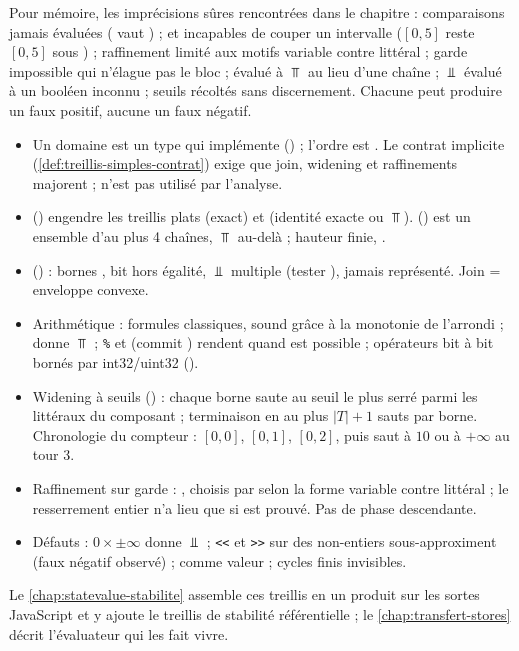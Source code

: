 Pour mémoire, les imprécisions sûres rencontrées dans le chapitre :
comparaisons jamais évaluées ( vaut ) ;
 et  incapables de couper un intervalle
($[0,5]$ reste $[0,5]$ sous ) ; raffinement limité aux motifs
\og variable contre littéral\fg{} ; garde impossible qui n'élague pas le
bloc ;  évalué à $\Top$ au lieu d'une chaîne ;
\code{!}$\Bot$ évalué à un booléen inconnu ; seuils récoltés sans
discernement. Chacune peut produire un faux positif, aucune un faux négatif.

\begin{resume}
\begin{itemize}
  \item Un domaine est un type qui implémente 
    () ; l'ordre est . Le contrat
    implicite (\cref{def:treillis-simples-contrat}) exige que join, widening
    et raffinements majorent ;  n'est pas utilisé par l'analyse.
  \item {} () engendre les
    treillis plats  (exact) et  (identité
    exacte ou $\Top$).  () est un ensemble
    d'au plus 4 chaînes, $\Top$ au-delà ; hauteur finie, .
  \item {} () : bornes , bit
     hors égalité, $\Bot$ multiple (tester ),
     jamais représenté. Join = enveloppe convexe.
  \item Arithmétique : formules classiques, sound grâce à la monotonie de
    l'arrondi ; \code{/} donne $\Top$ ; \texttt{\%} et \code{**} (commit
    ) rendent  quand  est possible ;
    opérateurs bit à bit bornés par int32/uint32 ().
  \item Widening à seuils () : chaque borne saute au seuil le plus
    serré parmi les littéraux du composant ; terminaison en au plus
    $|T| + 1$ sauts par borne. Chronologie du compteur : $[0,0]$, $[0,1]$,
    $[0,2]$, puis saut à $10$ ou à $+\infty$ au tour 3.
  \item Raffinement sur garde : , choisis par
     selon la forme \og variable contre
    littéral\fg{} ; le resserrement entier n'a lieu que si  est
    prouvé. Pas de phase descendante.
  \item Défauts : $0 \times \pm\infty$ donne $\Bot$ ; \texttt{<{}<} et \texttt{>{}>}
    sur des non-entiers sous-approximent (faux négatif observé) ;
     comme valeur ; cycles finis invisibles.
\end{itemize}
Le \cref{chap:statevalue-stabilite} assemble ces treillis en un produit sur
les sortes JavaScript et y ajoute le treillis de stabilité référentielle ;
le \cref{chap:transfert-stores} décrit l'évaluateur qui les fait vivre.
\end{resume}

